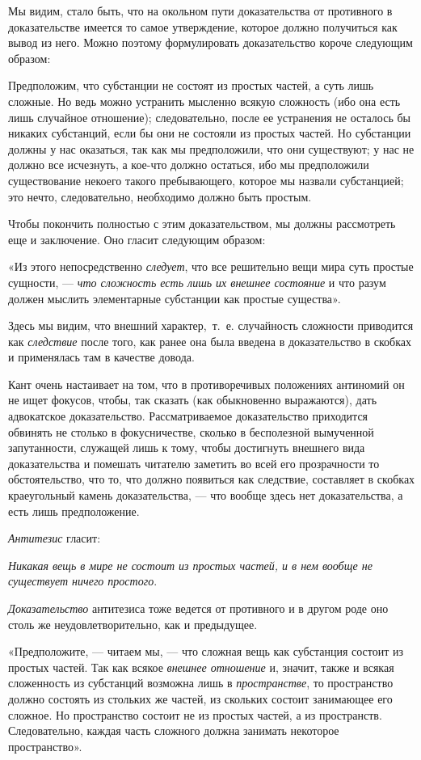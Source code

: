 Мы видим, стало быть, что на окольном пути доказательства от противного в
доказательстве имеется то самое утверждение, которое должно получиться как
вывод из него. Можно поэтому формулировать доказательство короче следующим
образом:

Предположим, что субстанции не состоят из простых частей, а суть лишь
сложные. Но ведь можно устранить мысленно всякую сложность (ибо она есть
лишь случайное отношение); следовательно, после ее устранения не осталось
бы никаких субстанций, если бы они не состояли из простых частей. Но
субстанции должны у нас оказаться, так как мы предположили, что они
существуют; у нас не должно все исчезнуть, а кое-что должно остаться, ибо
мы предположили существование некоего такого пребывающего, которое мы
назвали субстанцией; это нечто, следовательно, необходимо должно быть
простым.

Чтобы покончить полностью с этим доказательством, мы должны рассмотреть еще
и заключение. Оно гласит следующим образом:

«Из этого непосредственно {\em следует}, что все
решительно вещи мира суть простые сущности, — {\em что
сложность есть лишь их внешнее состояние} и что разум должен мыслить
элементарные субстанции как простые существа».

Здесь мы видим, что внешний характер,~т.~е. случайность сложности приводится
как {\em следствие} после того, как ранее она была
введена в доказательство в скобках и применялась там в качестве довода.

Кант очень настаивает на том, что в противоречивых положениях антиномий он
не ищет фокусов, чтобы, так сказать (как обыкновенно выражаются), дать
адвокатское доказательство. Рассматриваемое доказательство приходится
обвинять не столько в фокусничестве, сколько в бесполезной вымученной
запутанности, служащей лишь к тому, чтобы достигнуть внешнего вида
доказательства и помешать читателю заметить во всей его прозрачности то
обстоятельство, что то, что должно появиться как следствие, составляет в
скобках краеугольный камень доказательства, — что вообще здесь нет
доказательства, а есть лишь предположение.

{\em Антитезис} гласит:

{\em Никакая вещь в мире не состоит из простых частей, и
в нем вообще не существует ничего простого}.

{\em Доказательство} антитезиса тоже ведется от
противного и в другом роде оно столь же неудовлетворительно, как и
предыдущее.

«Предположите, — читаем мы, — что сложная вещь как субстанция состоит из
простых частей. Так как всякое {\em внешнее отношение}
и, значит, также и всякая сложенность из субстанций возможна лишь в
{\em пространстве}, то пространство должно состоять из
стольких же частей, из скольких состоит занимающее его сложное. Но
пространство состоит не из простых частей, а из пространств. Следовательно,
каждая часть сложного должна занимать некоторое пространство».

